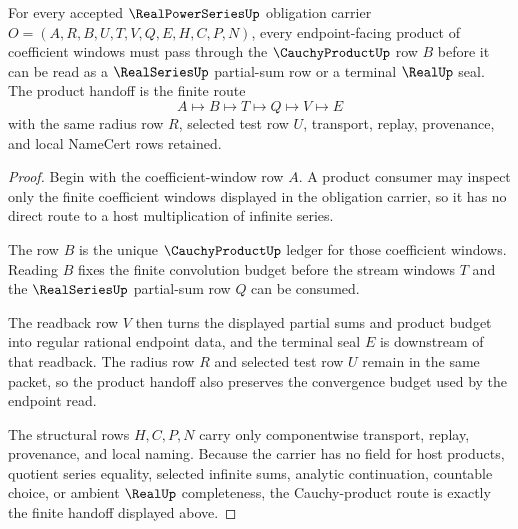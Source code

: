\begin{theorem}
\label{thm:real-power-series-cauchy-product-handoff}
For every accepted $\RealPowerSeriesUp$ obligation carrier $O=(A,R,B,U,T,V,Q,E,H,C,P,N)$, every endpoint-facing product of coefficient windows must pass through the $\CauchyProductUp$ row $B$ before it can be read as a $\RealSeriesUp$ partial-sum row or a terminal $\RealUp$ seal. The product handoff is the finite route
$$
A \longmapsto B \longmapsto T \longmapsto Q \longmapsto V \longmapsto E
$$
with the same radius row $R$, selected test row $U$, transport, replay, provenance, and local NameCert rows retained.
\end{theorem}
\begin{proof}
Begin with the coefficient-window row $A$. A product consumer may inspect only the finite coefficient windows displayed in the obligation carrier, so it has no direct route to a host multiplication of infinite series.

The row $B$ is the unique $\CauchyProductUp$ ledger for those coefficient windows. Reading $B$ fixes the finite convolution budget before the stream windows $T$ and the $\RealSeriesUp$ partial-sum row $Q$ can be consumed.

The readback row $V$ then turns the displayed partial sums and product budget into regular rational endpoint data, and the terminal seal $E$ is downstream of that readback. The radius row $R$ and selected test row $U$ remain in the same packet, so the product handoff also preserves the convergence budget used by the endpoint read.

The structural rows $H,C,P,N$ carry only componentwise transport, replay, provenance, and local naming. Because the carrier has no field for host products, quotient series equality, selected infinite sums, analytic continuation, countable choice, or ambient $\RealUp$ completeness, the Cauchy-product route is exactly the finite handoff displayed above.
\end{proof}

